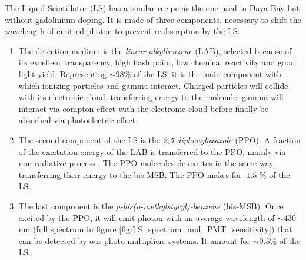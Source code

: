 The Liquid Scintillator (LS) has a similar recipe as the one used in Daya Bay \cite{bay_optimization_2020} but without gadolinium doping. It is made of three components, necessary to shift the wavelength of emitted photon to prevent reabsorption by the LS:
\begin{enumerate}
  \item The detection medium is the \textit{linear alkylbenzene} (LAB), selected because of its excellent transparency, high flash point, low chemical reactivity and good light yield. Representing $\sim 98\%$ of the LS, it is the main component with which ionizing particles and gamma interact. Charged particles will collide with its electronic cloud, transferring energy to the molecule, gamma will interact via compton effect with the electronic cloud before finally be absorbed via photoelectric effect.
  \item The second component of the LS is the \textit{2,5-diphenyloxazole} (PPO). A fraction of the excitation energy of the LAB is transferred to the PPO, mainly via non radiative process \cite{birks_chapter_1964}. The PPO molecules de-excites in the same way, transferring their energy to the bis-MSB. The PPO makes for $~1.5$ \% of the LS.
  \item The last component is the \textit{p-bis(o-methylstyryl)-benzene} (bis-MSB). Once excited by the PPO, it will emit photon with an average wavelength of $\sim430$ nm (full spectrum in figure \ref{fig:LS_spectrum_and_PMT_sensitivity}) that can be detected by our photo-multipliers systems. It amount for $\sim 0.5$\% of the LS.
\end{enumerate}

